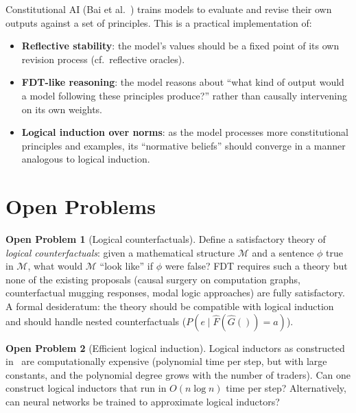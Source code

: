 \documentclass[11pt,a4paper]{article}
\theoremstyle{definition}
\newtheorem{problem}{Open Problem}
\theoremstyle{remark}
\begin{document}
Constitutional AI (Bai et al.~\cite{bai2022constitutional}) trains
models to evaluate and revise their own outputs against a set of
principles.  This is a practical implementation of:
\begin{itemize}
  \item \textbf{Reflective stability}: the model's values should be
    a fixed point of its own revision process (cf.\ reflective oracles).
  \item \textbf{FDT-like reasoning}: the model reasons about ``what
    kind of output would a model following these principles produce?''
    rather than causally intervening on its own weights.
  \item \textbf{Logical induction over norms}: as the model processes
    more constitutional principles and examples, its ``normative
    beliefs'' should converge in a manner analogous to logical induction.
\end{itemize}

\section{Open Problems}\label{sec:open}

\begin{problem}[Logical counterfactuals]
Define a satisfactory theory of \emph{logical counterfactuals}: given a
mathematical structure $\mathcal{M}$ and a sentence $\phi$ true in
$\mathcal{M}$, what would $\mathcal{M}$ ``look like'' if $\phi$ were
false?  FDT requires such a theory but none of the existing proposals
(causal surgery on computation graphs, counterfactual mugging
responses, modal logic approaches) are fully satisfactory.  A formal
desideratum: the theory should be compatible with logical induction
and should handle nested counterfactuals
($P(e \mid \widehat{F}(\widehat{G}()) = a)$).
\end{problem}

\begin{problem}[Efficient logical induction]
Logical inductors as constructed in~\cite{garrabrant2016logical} are
computationally expensive (polynomial time per step, but with large
constants, and the polynomial degree grows with the number of traders).
Can one construct logical inductors that run in $O(n \log n)$ time per
step?  Alternatively, can neural networks be trained to approximate
logical inductors?
\end{problem}
\end{document}
